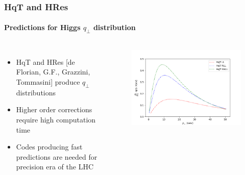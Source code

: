 \documentclass[aspectratio=43]{beamer}
\begin{document}
\begin{frame}

	\frametitle{HqT and HRes}
	\framesubtitle{Predictions for Higgs $q_{\perp}$ distribution}
	
	\begin{columns}
		
			
			\begin{itemize}
				\item HqT and HRes {\color{blue}[de Florian, G.F., Grazzini, Tommasini]} produce $q_{\perp}$ distributions
				\item Higher order corrections require {\color{red}high computation time}
				\item Codes producing fast predictions are needed for precision era of the LHC
			\end{itemize}

	
		\begin{figure}
			\includegraphics[width = 7 cm]{plots/higgs_qt_all.png}
		\end{figure}		
			
	\end{columns}

\end{frame}
\end{document}

